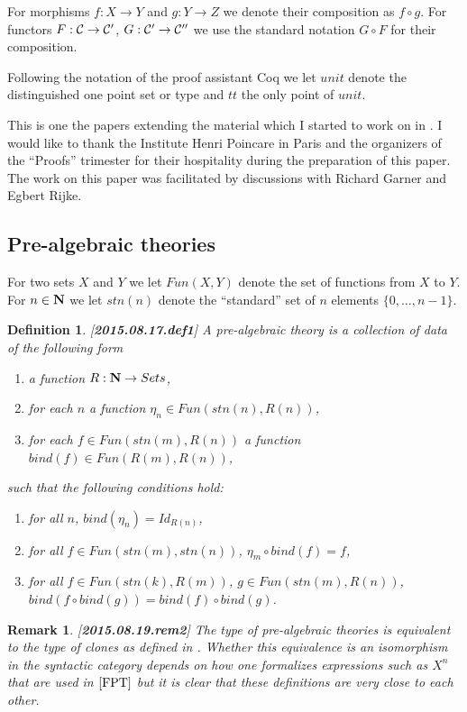 \documentclass[11pt]{article}
\newtheorem{definition}[proposition]{Definition}
\newtheorem{remark}[proposition]{Remark}
\newcommand{\llabel}[1]{\label{#1}[{\bf #1}]}
\newcommand{\sr}{\rightarrow}
\newcommand{\nn}{{\bf N\rm}}
\newcommand{\nat}{\nn}
\newcommand{\wh}{\widehat}
\newcommand{\bind}{bind}
\begin{document}
For morphisms $f:X\sr Y$ and $g:Y\sr Z$ we denote their composition as $f\circ g$. For functors $F:{\cal C}\sr {\cal C}'$, $G:{\cal C}'\sr {\cal C}''$ we use the standard notation $G\circ F$ for their composition. 

Following the notation of the proof assistant Coq we let $unit$ denote the distinguished one point set or type and $tt$ the only point of $unit$. 

This is one the papers extending the material which I started to work on in \cite{NTS}. I would like to thank the Institute Henri Poincare in Paris and the organizers of the ``Proofs'' trimester for their hospitality during the preparation of this paper. The work on this paper was facilitated by discussions with Richard Garner and Egbert Rijke. 






\subsection{Pre-algebraic theories}
%
For two sets $X$ and $Y$ we let $Fun(X,Y)$ denote the set of functions from $X$ to $Y$. For $n\in\nat$ we let $stn(n)$ denote the ``standard'' set of $n$ elements $\{0,\dots,n-1\}$.
% 
\begin{definition}
\llabel{2015.08.17.def1}
A pre-algebraic theory is a collection of data of the following form
%
\begin{enumerate}
\item a function $R:\nn\sr Sets$,
\item for each $n$ a function $\eta_{n}\in Fun(stn(n),R(n))$,
\item for each $f\in Fun(stn(m),R(n))$ a function $\bind(f)\in Fun(R(m),R(n))$,
\end{enumerate}
%
such that the following conditions hold:
%
\begin{enumerate}
\item for all $n$, $\bind(\eta_n)=Id_{R(n)}$,
\item for all $f\in Fun(stn(m),stn(n))$, $\eta_m\circ \bind(f)=f$,
\item for all $f\in Fun(stn(k),R(m))$, $g\in Fun(stn(m),R(n))$, $\bind(f\circ \bind(g))=\bind(f)\circ \bind(g)$.
\end{enumerate}
%
\end{definition}
%
\begin{remark}\rm
\llabel{2015.08.19.rem2}
The type of pre-algebraic theories is equivalent to the type of clones as defined in \cite[Section 3]{FPT}. Whether this equivalence is an isomorphism in the syntactic category depends on how one formalizes expressions such as $X^n$ that are used in $\cite{FPT}$ but it is clear that these definitions are very close to each other. 
\end{remark} 
%
\end{document}
